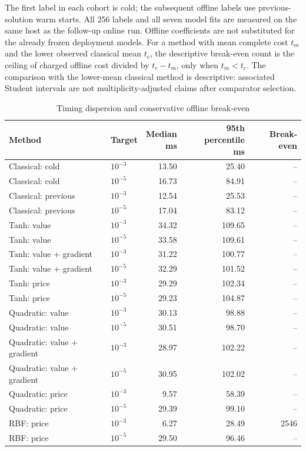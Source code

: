 \documentclass[11pt,letterpaper]{article}
\theoremstyle{definition}
\newcommand{\1}{\mathbf 1}
\begin{document}
The first label in each cohort is cold; the subsequent offline labels use previous-solution warm starts. All 256 labels and all seven model fits are measured on the same host as the follow-up online run. Offline coefficients are not substituted for the already frozen deployment models. For a method with mean complete cost $t_m$ and the lower observed classical mean $t_c$, the descriptive break-even count is the ceiling of charged offline cost divided by $t_c-t_m$, only when $t_m<t_c$. The comparison with the lower-mean classical method is descriptive: associated Student intervals are not multiplicity-adjusted claims after comparator selection.

\begin{table}[p]
\centering
\caption{Timing dispersion and conservative offline break-even}\label{tab:r19-cost-details}
\setlength{\tabcolsep}{4pt}
\begin{tabular}{llrrr}
\toprule
Method & Target & \shortstack{Median\\ms} & \shortstack{95th percentile\\ms} & Break-even \\
\midrule
Classical: cold & $10^{-3}$ & 13.50 & 25.40 & -- \\
Classical: cold & $10^{-5}$ & 16.73 & 84.91 & -- \\
Classical: previous & $10^{-3}$ & 12.54 & 25.53 & -- \\
Classical: previous & $10^{-5}$ & 17.04 & 83.12 & -- \\
Tanh: value & $10^{-3}$ & 34.32 & 109.65 & -- \\
Tanh: value & $10^{-5}$ & 33.58 & 109.61 & -- \\
Tanh: value + gradient & $10^{-3}$ & 31.22 & 100.77 & -- \\
Tanh: value + gradient & $10^{-5}$ & 32.29 & 101.52 & -- \\
Tanh: price & $10^{-3}$ & 29.29 & 102.34 & -- \\
Tanh: price & $10^{-5}$ & 29.23 & 104.87 & -- \\
Quadratic: value & $10^{-3}$ & 30.13 & 98.88 & -- \\
Quadratic: value & $10^{-5}$ & 30.51 & 98.70 & -- \\
Quadratic: value + gradient & $10^{-3}$ & 28.97 & 102.22 & -- \\
Quadratic: value + gradient & $10^{-5}$ & 30.95 & 102.02 & -- \\
Quadratic: price & $10^{-3}$ & 9.57 & 58.39 & -- \\
Quadratic: price & $10^{-5}$ & 29.39 & 99.10 & -- \\
RBF: price & $10^{-3}$ & 6.27 & 28.49 & 2546 \\
RBF: price & $10^{-5}$ & 29.50 & 96.46 & -- \\
\bottomrule
\end{tabular}


\end{table}
\end{document}
